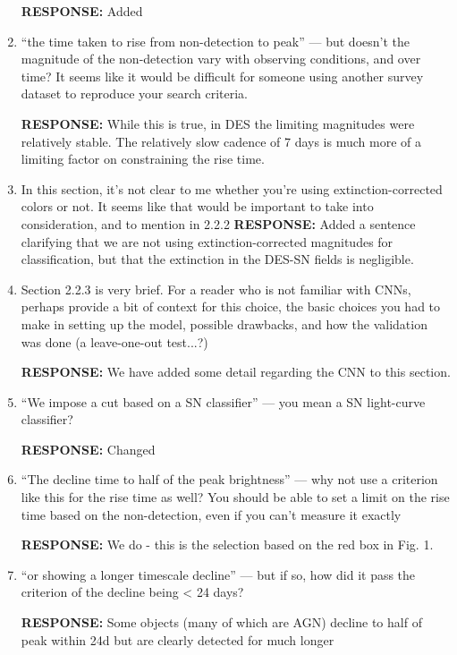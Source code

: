 \documentclass{article}
\begin{document}
\begin{enumerate}
\vskip0.1cm
{\bf RESPONSE: } Added 

\item “the time taken to rise from non-detection to peak” — but doesn’t the magnitude of the non-detection vary with observing conditions, and over time? It seems like it would be difficult for someone using another survey dataset to reproduce your search criteria.

\vskip0.1cm
{\bf RESPONSE: } While this is true, in DES the limiting magnitudes were relatively stable. The relatively slow cadence of 7 days is much more of a limiting factor on constraining the rise time.

\item In this section, it’s not clear to me whether you’re using extinction-corrected colors or not. It seems like that would be important to take into consideration, and to mention in 2.2.2
\vskip0.1cm
{\bf RESPONSE: } Added a sentence clarifying that we are not using extinction-corrected magnitudes for classification, but that the extinction in the DES-SN fields is negligible.

\item Section 2.2.3 is very brief. For a reader who is not familiar with CNNs, perhaps provide a bit of context for this choice, the basic choices you had to make in setting up the model, possible drawbacks, and how the validation was done (a leave-one-out test...?)

\vskip0.1cm
{\bf RESPONSE: } We have added some detail regarding the CNN to this section.

\item “We impose a cut based on a SN classifier” — you mean a SN light-curve classifier?

\vskip0.1cm
{\bf RESPONSE: } Changed

\item  “The decline time to half of the peak brightness” — why not use a criterion like this for the rise time as well? You should be able to set a limit on the rise time based on the non-detection, even if you can’t measure it exactly

\vskip0.1cm
{\bf RESPONSE: } We do - this is the selection based on the red box in Fig. 1.

\item “or showing a longer timescale decline” — but if so, how did it pass the criterion of the decline being < 24 days?

\vskip0.1cm
{\bf RESPONSE: } Some objects (many of which are AGN) decline to half of peak within 24d but are clearly detected for much longer


\end{enumerate}
\end{document}

